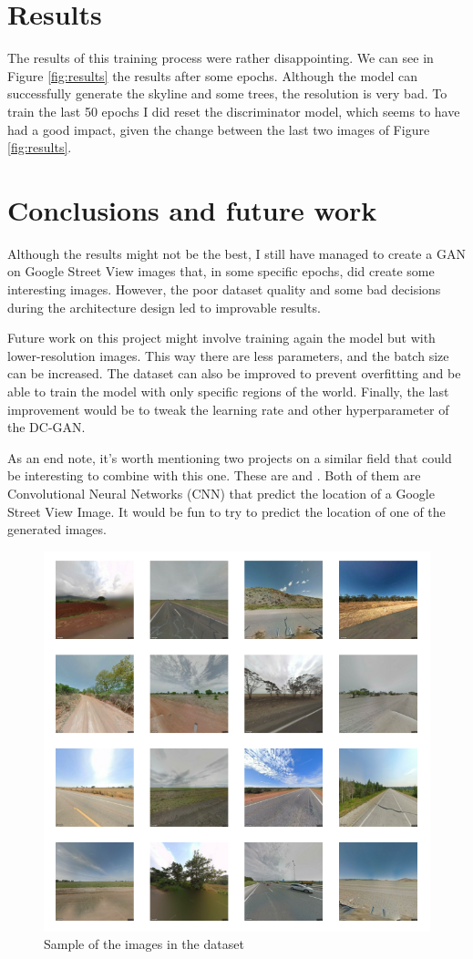 \documentclass{article}
\begin{document}
\section{Results}

The results of this training process were rather disappointing. We can see in Figure \ref{fig:results} the results after some epochs. Although the model can successfully generate
the skyline and some trees, the resolution is very bad.
To train the last 50 epochs I did reset the discriminator model, which seems to have had a good impact, given the change between the last two images of Figure \ref{fig:results}.

\section{Conclusions and future work}

Although the results might not be the best, I still have managed to create a GAN on Google Street View images that, in some specific epochs, did create some interesting images. However, the poor dataset quality and some bad decisions during the architecture design led to improvable results.

Future work on this project might involve training again the model but with lower-resolution images. This way there are less parameters, and the batch size can be increased. The dataset can also be improved to prevent overfitting and be able to train the model with only specific regions of the world. Finally, the last improvement would be to tweak the learning rate and other hyperparameter of the DC-GAN.

As an end note, it's worth mentioning two projects on a similar field that could be interesting to combine with this one. These are \cite{streetViewAI1} and \cite{streetViewAI2}. Both of them are Convolutional Neural Networks (CNN) that predict the location of a Google Street View Image. It would be fun to try to predict the location of one of the generated images.

{}


\begin{figure}[H]
    \centering
    \includegraphics[width=0.7\linewidth]{input.png}
    \caption{Sample of the images in the dataset}
    \label{fig:input}
\end{figure}
\end{document}

